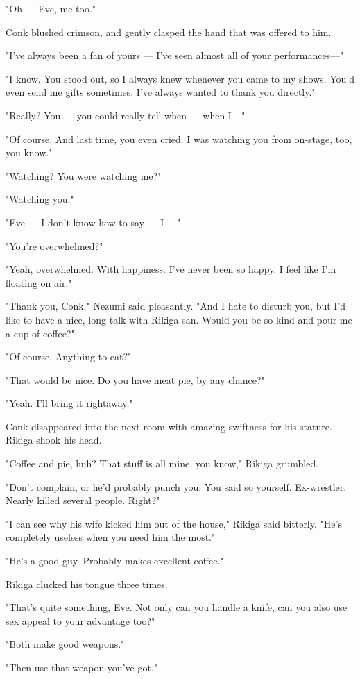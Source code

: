 "Oh --- Eve, me too."

Conk blushed crimson, and gently clasped the hand that was offered to
him.

"I've always been a fan of yours --- I've seen almost all of your
performances---"

"I know. You stood out, so I always knew whenever you came to my shows.
You'd even send me gifts sometimes. I've always wanted to thank you
directly."

"Really? You --- you could really tell when --- when I---"

"Of course. And last time, you even cried. I was watching you from
on-stage, too, you know."

"Watching? You were watching me?"

"Watching you."

"Eve --- I don't know how to say --- I ---"

"You're overwhelmed?"

"Yeah, overwhelmed. With happiness. I've never been so happy. I feel
like I'm floating on air."

"Thank you, Conk," Nezumi said pleasantly. "And I hate to disturb you,
but I'd like to have a nice, long talk with Rikiga-san. Would you be so
kind and pour me a cup of coffee?"

"Of course. Anything to eat?"

"That would be nice. Do you have meat pie, by any chance?"

"Yeah. I'll bring it rightaway."

Conk disappeared into the next room with amazing swiftness for his
stature. Rikiga shook his head.

"Coffee and pie, huh? That stuff is all mine, you know," Rikiga
grumbled.

"Don't complain, or he'd probably punch you. You said so yourself.
Ex-wrestler. Nearly killed several people. Right?"

"I can see why his wife kicked him out of the house," Rikiga said
bitterly. "He's completely useless when you need him the most."

"He's a good guy. Probably makes excellent coffee."

Rikiga clucked his tongue three times.

"That's quite something, Eve. Not only can you handle a knife, can you
also use sex appeal to your advantage too?"

"Both make good weapons."

"Then use that weapon you've got."

